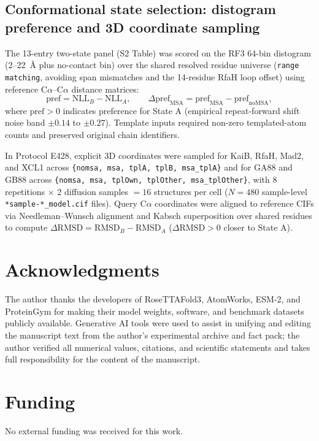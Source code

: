 \documentclass[10pt,a4paper]{article}
\begin{document}
\subsection{Conformational state selection: distogram preference and 3D coordinate sampling}
The 13-entry two-state panel (S2 Table) was scored on the RF3 64-bin distogram (2--22~\AA{} plus no-contact bin) over the shared resolved residue universe (\texttt{range matching}, avoiding span mismatches and the 14-residue RfaH loop offset) using reference C$\alpha$--C$\alpha$ distance matrices:
\begin{equation}
    \mathrm{pref} = \mathrm{NLL}_B - \mathrm{NLL}_A, \qquad \Delta\mathrm{pref}_{\mathrm{MSA}} = \mathrm{pref}_{\mathrm{MSA}} - \mathrm{pref}_{\mathrm{noMSA}},
\end{equation}
where $\mathrm{pref} > 0$ indicates preference for State A (empirical repeat-forward shift noise band $\pm 0.14$ to $\pm 0.27$). Template inputs required non-zero templated-atom counts and preserved original chain identifiers.

In Protocol E428, explicit 3D coordinates were sampled for KaiB, RfaH, Mad2, and XCL1 across \texttt{\{nomsa, msa, tplA, tplB, msa\_tplA\}} and for GA88 and GB88 across \texttt{\{nomsa, msa, tplOwn, tplOther, msa\_tplOther\}}, with 8 repetitions $\times$ 2 diffusion samples $= 16$ structures per cell ($N=480$ sample-level \texttt{*sample-*\_model.cif} files). Query C$\alpha$ coordinates were aligned to reference CIFs via Needleman--Wunsch alignment and Kabsch superposition over shared residues to compute $\Delta\mathrm{RMSD} = \mathrm{RMSD}_B - \mathrm{RMSD}_A$ ($\Delta\mathrm{RMSD} > 0$ closer to State A).

\section*{Acknowledgments}
The author thanks the developers of RoseTTAFold3, AtomWorks, ESM-2, and ProteinGym for making their model weights, software, and benchmark datasets publicly available. Generative AI tools were used to assist in unifying and editing the manuscript text from the author's experimental archive and fact pack; the author verified all numerical values, citations, and scientific statements and takes full responsibility for the content of the manuscript.

\section*{Funding}
No external funding was received for this work.
\end{document}
